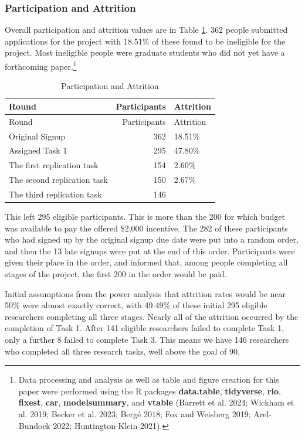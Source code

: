 \documentclass[
  letterpaper,
  DIV=11,
  numbers=noendperiod]{scrartcl}
\begin{document}
\hypertarget{participation-and-attrition}{%
\subsubsection{Participation and
Attrition}\label{participation-and-attrition}}

Overall participation and attrition values are in Table
\ref{tbl-attrition}. 362 people submitted applications for the project
with 18.51\% of these found to be ineligible for the project. Most
ineligible people were graduate students who did not yet have a
forthcoming paper.\footnote{Data processing and analysis as well as
  table and figure creation for this paper were performed using the R
  packages \textbf{data.table}, \textbf{tidyverse}, \textbf{rio},
  \textbf{fixest}, \textbf{car}, \textbf{modelsummary}, and
  \textbf{vtable} (Barrett et al. 2024; Wickham et al. 2019; Becker et
  al. 2023; Bergé 2018; Fox and Weisberg 2019; Arel-Bundock 2022;
  Huntington-Klein 2021).}

\begin{longtable}[]{@{}lrl@{}}
\caption{Participation and
Attrition\label{tbl-attrition}}\tabularnewline
\toprule\noalign{}
Round & Participants & Attrition \\
\midrule\noalign{}
\endfirsthead
\toprule\noalign{}
Round & Participants & Attrition \\
\midrule\noalign{}
\endhead
\bottomrule\noalign{}
\endlastfoot
Original Signup & 362 & 18.51\% \\
Assigned Task 1 & 295 & 47.80\% \\
The first replication task & 154 & 2.60\% \\
The second replication task & 150 & 2.67\% \\
The third replication task & 146 & \\
\end{longtable}

This left 295 eligible participants. This is more than the 200 for which
budget was available to pay the offered \$2,000 incentive. The 282 of
these participants who had signed up by the original signup due date
were put into a random order, and then the 13 late signups were put at
the end of this order. Participants were given their place in the order,
and informed that, among people completing all stages of the project,
the first 200 in the order would be paid.

Initial assumptions from the power analysis that attrition rates would
be near 50\% were almost exactly correct, with 49.49\% of these initial
295 eligible researchers completing all three stages. Nearly all of the
attrition occurred by the completion of Task 1. After 141 eligible
researchers failed to complete Task 1, only a further 8 failed to
complete Task 3. This means we have 146 researchers who completed all
three research tasks, well above the goal of 90.
\end{document}

